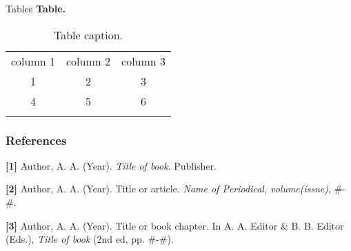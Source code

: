 \documentclass[10pt,aspectratio=169]{beamer}
\begin{document}
\begin{frame}[t]{Tables}
\textbf{Table.}
\begin{table}
    \centering
    \begin{tabular}{c|cc}
        \hline
        \noalign{\smallskip}
        column 1 & column 2 & column 3 \\
        \noalign{\smallskip}
        \hline
        \noalign{\smallskip}
        1 & 2 & 3 \\
        4 & 5 & 6 \\
        \noalign{\smallskip}
        \hline
    \end{tabular}
    \caption{Table caption.}
\end{table}
\end{frame}

\begin{frame}[t]
\frametitle{References}
\textbf{[1]} Author, A. A. (Year). \textit{Title of book}. Publisher.

\textbf{[2]} Author, A. A. (Year). Title or article. \textit{Name of Periodical, volume(issue)}, \#-\#.

\textbf{[3]} Author, A. A. (Year). Title or book chapter. In A. A. Editor \& B. B. Editor (Eds.), \textit{Title of book} (2nd ed, pp. \#-\#).
\end{frame}

{
\begin{frame}[plain,t]
\end{frame}
}
\end{document}
